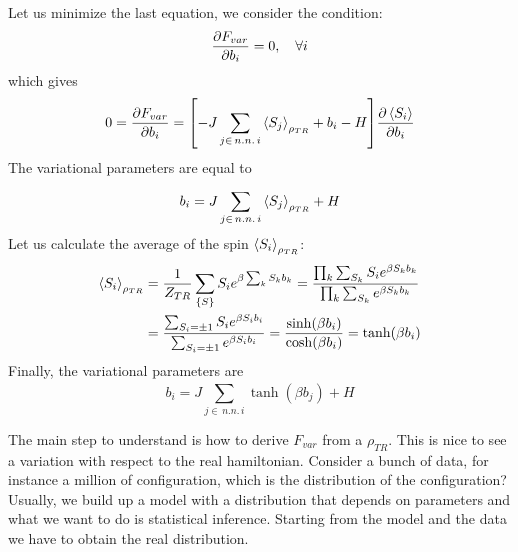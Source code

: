 \documentclass[../../Main/Main.tex]{subfiles}
\begin{document}
Let us minimize the last equation, we consider the condition:
\begin{equation*}
  \pdv{F_{var}}{b_i} = 0, \quad \forall i
\end{equation*}
which gives
\begin{equation*}
  0 = \pdv{F_{var}}{b_i} = \qty[-J \sum_{j \in \, n.n. \, i}^{} \expval{S_j}_{\rho _{TR}}  + b_i - H  ] \pdv{\expval{S_i} }{b_i}
\end{equation*}
The variational parameters are equal to
\begin{equation*}
  b_i = J \sum_{j\in \, n.n. \, i}^{} \expval{S_j}_{\rho _{TR}} + H
\end{equation*}
Let us calculate the average of the spin \( \expval{S_i}_{\rho _{TR}} \):
\begin{equation*}
\begin{split}
\expval{S_i}_{\rho _{TR}}    &= \frac{1}{Z_{TR}} \sum_{\{ S \}  }^{} S_i e^{\beta \sum_{k}^{} S_k b_k } = \frac{\prod_{k}^{}  \sum_{S_k}^{} S_i e^{\beta S_k b_k}   }{\prod_{k}^{} \sum_{S_k}^{} e^{\beta S_k b_k}    }  \\
& = \frac{\sum_{S_i = \pm 1}^{} S_i e^{\beta S_i b_i}  }{\sum_{S_i = \pm 1}^{} e^{\beta S_i b_i}   } = \frac{\sinh (\beta b_i)}{\cosh (\beta b_i)} 
= \tanh (\beta b_i)
\end{split}
\end{equation*}
Finally, the variational parameters are 
\begin{equation}
  b_i = J \sum_{j \in \, n.n. \, i}^{} \tanh (\beta b_j) + H
\end{equation}
\begin{remark}
The main step to understand is how to derive \( F_{var} \) from a \( \rho _{TR} \).
This is nice to see a variation with respect to the real hamiltonian.
Consider a bunch of data, for instance a million of configuration, which is the distribution of the configuration? Usually, we build up a model with a distribution that depends on parameters and what we want to do is statistical inference. Starting from the model and the data we have to obtain the real distribution. 
\end{remark}
\end{document}
